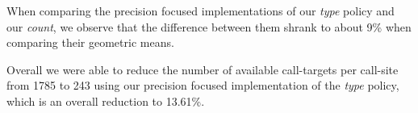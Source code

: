 When comparing the precision focused implementations of our \textit{type} policy and our \textit{count}, we observe that the difference between them shrank to about 9\% when 
comparing their geometric means.

Overall we were able to reduce the number of available call-targets per call-site from 1785 to 243 using our precision focused implementation of the \textit{type} policy,
which is an overall reduction to 13.61\%.

\begin{table*}[htbp!]
		\caption {The results of comparing our implementation results with the theoretical limits for the different restriction policies combined with an an address taken analysis for optimization level O2.}
		\label{tbl:policycompat}
\end{table*}


